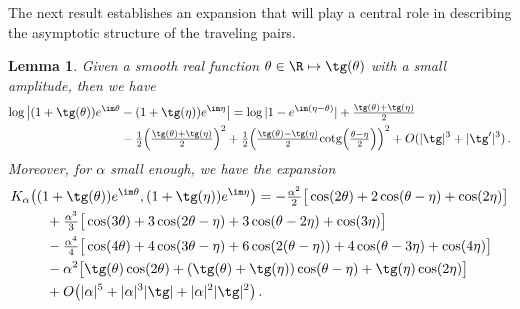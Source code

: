 \documentclass[a4paper,reqno,10pt]{article}
\newtheorem{lem}{Lemma}[section]
\begin{document}
The next result establishes an expansion that will play a central role in describing the asymptotic structure of the traveling pairs.
\begin{lem}\label{lemma.kernels}
	Given a smooth real function $\theta\in\R\mapsto \tg(\theta)$ with a small amplitude, then we have
	\begin{equation}\label{BS.kernel.expand}
		\begin{aligned}
			\log \big| (1+\tg(\theta))e^{\im\theta} & - (1+\tg(\eta))e^{\im\eta} \big|  = \log| 1-e^{\im(\eta-\theta)} |  + \tfrac{\tg(\theta)+\tg(\eta)}{2} \\
			& -\tfrac12 \Big( \tfrac{\tg(\theta)+\tg(\eta)}{2} \Big)^2 +\tfrac12 \Big( \tfrac{\tg(\theta)-\tg(\eta)}{2} {\rm cotg} \Big(\tfrac{\theta-\eta}{2} \Big) \Big)^2 + O({|\tg|^3}+|\tg^\prime|^3) \,. 
				\end{aligned}
		\end{equation}
		Moreover, for $\alpha$ small enough, we have the expansion
		\begin{equation}\label{inter.kernel}
			\begin{aligned}
			K_\alpha\big( & (1+\tg(\theta))e^{\im\theta} ,  (1+\tg(\eta))e^{\im\eta} \big)  = - \tfrac{\alpha^2}{2}\big[  \cos(2\theta) +2 \cos(\theta-\eta) + \cos(2\eta) \big] \\
			& \ \ +\tfrac{\alpha^3}{3} \big[ \cos(3\theta) + 3\cos(2\theta-\eta) + 3 \cos(\theta-2\eta) + \cos(3\eta) \big] \\
			& \ \ - \tfrac{\alpha^4}{4} \big[ \cos(4\theta) + 4 \cos(3\theta-\eta) + 6\cos(2(\theta-\eta))  + 4\cos(\theta-3\eta) + \cos(4\eta)\big] \\
			& \ \ -\alpha^2\big[ \tg(\theta)\cos(2\theta)  + (\tg(\theta)+\tg(\eta)) \cos(\theta-\eta) + \tg(\eta)\cos(2\eta) \big] \\
			& \ \ +O\big(|\alpha|^5+|\alpha|^3 |\tg| +|\alpha|^2 | \tg|^2 \big) \,.
		\end{aligned}
	\end{equation}
\end{lem}
\end{document}
